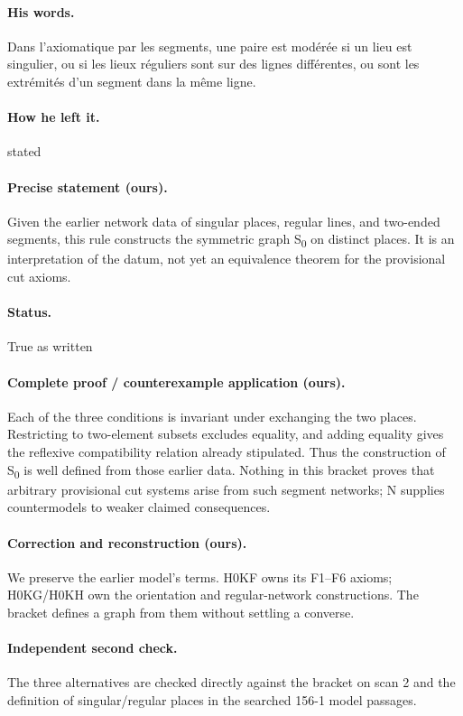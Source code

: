 \paragraph{His words.} Dans l’axiomatique par les segments, une paire est modérée si un lieu est singulier, ou si les lieux réguliers sont sur des lignes différentes, ou sont les extrémités d’un segment dans la même ligne.

\paragraph{How he left it.} stated

\paragraph{Precise statement (ours).} Given the earlier network data of singular places, regular lines, and two-ended segments, this rule constructs the symmetric graph S\textsubscript{0} on distinct places. It is an interpretation of the datum, not yet an equivalence theorem for the provisional cut axioms.

\paragraph{Status.} True as written

\paragraph{Complete proof / counterexample application (ours).} Each of the three conditions is invariant under exchanging the two places. Restricting to two-element subsets excludes equality, and adding equality gives the reflexive compatibility relation already stipulated. Thus the construction of S\textsubscript{0} is well defined from those earlier data. Nothing in this bracket proves that arbitrary provisional cut systems arise from such segment networks; N supplies countermodels to weaker claimed consequences.

\paragraph{Correction and reconstruction (ours).} We preserve the earlier model’s terms. H0KF owns its F1–F6 axioms; H0KG/H0KH own the orientation and regular-network constructions. The bracket defines a graph from them without settling a converse.

\paragraph{Independent second check.} The three alternatives are checked directly against the bracket on scan 2 and the definition of singular/regular places in the searched 156-1 model passages.

